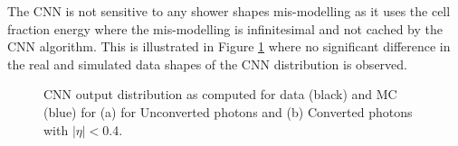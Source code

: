 The CNN is not sensitive to any shower shapes mis-modelling as it uses the cell fraction energy where the mis-modelling is infinitesimal and not cached by the CNN algorithm. This is illustrated in Figure \ref{fig:gamma:CNN:Zllg:CNNOutput} where no significant difference in the real and simulated data shapes of the CNN distribution is observed.
\begin{figure}[htbp]
   \centering
	\begin{tcolorbox}[colback=black!5!white,colframe=white!75!black]
    \caption{CNN output distribution as computed for data (black) and MC (blue) for (a) for Unconverted photons and (b) Converted photons with $|\eta|<$0.4.}
    \label{fig:gamma:CNN:Zllg:CNNOutput}
    \end{tcolorbox}
    
\end{figure}

